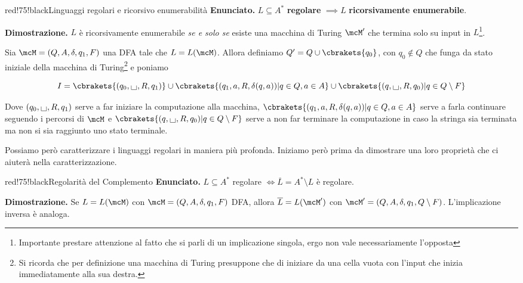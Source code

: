 \begin{halfframedbox}{red!75!black}{Linguaggi regolari e ricorsivo enumerabilità}
  \textbf{Enunciato. } \(L \subseteq A^*\) \textbf{regolare} \(\implies L\) \textbf{ricorsivamente enumerabile}.

  \begin{center}
    \textcolor{red!75!black}{\hdashrule[0.5ex]{18cm}{1pt}{3mm 3pt 1mm 2pt}}
  \end{center}

  \textbf{Dimostrazione. } \(L\) è ricorsivamente enumerabile \textit{se e solo se} esiste una macchina di Turing \(\mcM'\) che termina solo su input in \(L\)\footnote{Importante prestare attenzione al fatto che si parli di un implicazione singola, ergo non vale necessariamente l'opposta}.

  Sia \(\mcM=(Q,A,\delta,q_1,F)\) una DFA tale che \(L=L(\mcM)\). Allora definiamo \(Q'=Q\cup\cbrakets{q_0}\), con \(q_0 \nin Q\) che funga da stato iniziale della macchina di Turing\footnote{Si ricorda che per definizione una macchina di Turing presuppone che di iniziare da una cella vuota con l'input che inizia immediatamente alla sua destra.} e poniamo

  \begin{equation}
    I=\cbrakets{(q_0, \text{\Large{\textbf{\textvisiblespace}}},R,q_1)} \cup \cbrakets{(q_1,a,R,\delta(q,a))\vert q\in Q, a \in A} \cup \cbrakets{(q,\text{\Large{\textbf{\textvisiblespace}}},R,q_0)\vert q \in Q\setminus F}
  \end{equation}

  Dove \((q_0, \text{\Large{\textbf{\textvisiblespace}}},R,q_1)\) serve a far iniziare la computazione alla macchina, \(\cbrakets{(q_1,a,R,\delta(q,a))\vert q\in Q, a \in A}\) serve a farla continuare seguendo i percorsi di \(\mcM\) e \(\cbrakets{(q,\text{\Large{\textbf{\textvisiblespace}}},R,q_0)\vert q \in Q\setminus F}\) serve a non far terminare la computazione in caso la stringa sia terminata ma non si sia raggiunto uno stato terminale.
\end{halfframedbox}

Possiamo però caratterizzare i linguaggi regolari in maniera più profonda. Iniziamo però prima da dimostrare una loro proprietà che ci aiuterà nella caratterizzazione.

\begin{halfframedbox}{red!75!black}{Regolarità del Complemento}\label{Regolarità del Complemento}
  \textbf{Enunciato. } \(L \subseteq A^*\) regolare \(\iff \overline{L}=A^*\setminus L\) è regolare.

  \begin{center}
    \textcolor{red!75!black}{\hdashrule[0.5ex]{18cm}{1pt}{3mm 3pt 1mm 2pt}}
  \end{center}

  \textbf{Dimostrazione. } Se \(L=L(\mcM)\) con \(\mcM=(Q,A,\delta,q_1,F)\) DFA, allora \(\overline{L}=L(\mcM')\) con \(\mcM'=(Q,A,\delta,q_1,Q\setminus F)\). L'implicazione inversa è analoga.

\end{halfframedbox}

